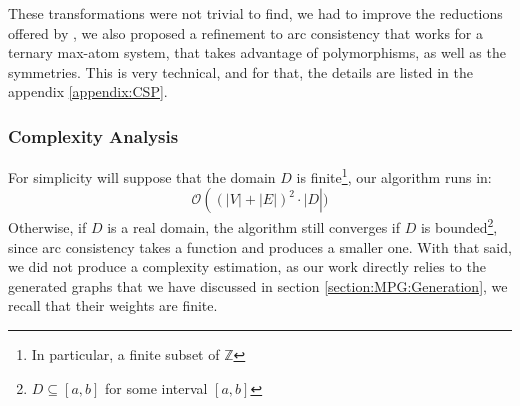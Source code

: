 These transformations were not trivial to find, we had to improve the reductions offered by \cite{MPGMaxAtom}, we also proposed a refinement to arc consistency that works for a ternary max-atom system, that takes advantage of polymorphisms, as well as the symmetries.
\newline This is very technical, and for that, the details are listed in the appendix \ref{appendix:CSP}.
\subsubsection{Complexity Analysis}
For simplicity will suppose that the domain $D$ is finite\footnote{In particular, a finite subset of $\mathbb{Z}$}, our algorithm runs in:
\begin{equation*}
	\mathcal{O}\left((\lvert V\rvert +\lvert E\rvert)^2 \cdot \lvert D\right\rvert)
\end{equation*}
Otherwise, if $D$ is a real domain, the algorithm still converges if $D$ is bounded\footnote{$D\subseteq [a,b]$ for some interval $[a,b]$}, since arc consistency takes a function and produces a smaller one. With that said, we did not produce a complexity estimation, as our work directly relies to the generated graphs that we have discussed in section \ref{section:MPG:Generation}, we recall that their weights are finite.



